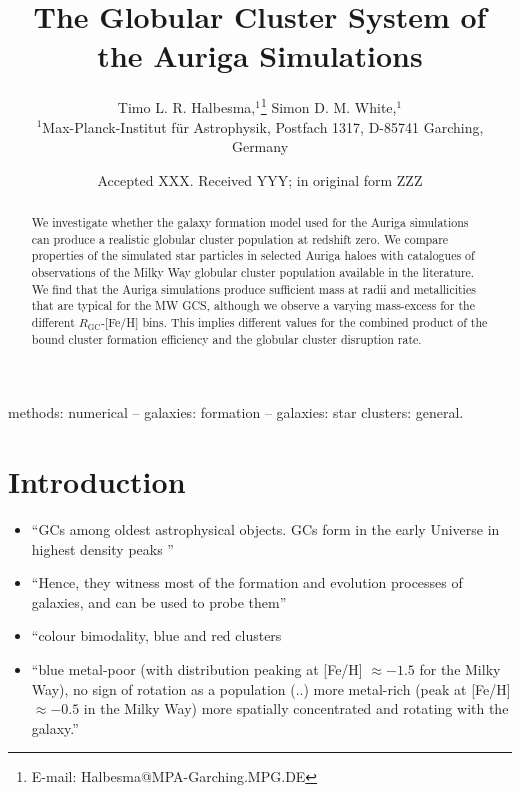 \documentclass[a4paper,fleqn,usenatbib]{mnras}
\title[Auriga GCS]{The Globular Cluster System of the Auriga Simulations}
\author[T. L. R. Halbesma et al.]{
Timo L. R. Halbesma,$^{1}$\thanks{E-mail: Halbesma@MPA-Garching.MPG.DE}
Simon D. M. White,$^{1}$
\\
$^{1}$Max-Planck-Institut f\"ur Astrophysik, Postfach 1317, D-85741 Garching, Germany\\
}
\date{Accepted XXX. Received YYY; in original form ZZZ}
\begin{document}
\label{firstpage}
\pagerange{\pageref{firstpage}--\pageref{lastpage}}
\maketitle

\begin{abstract}
We investigate whether the galaxy formation model used for the Auriga simulations 
can produce a realistic globular cluster population at redshift zero. We compare
properties of the simulated star particles in selected Auriga haloes with
catalogues of observations of the Milky Way globular cluster population available
in the literature. We find that the Auriga simulations produce sufficient mass
at radii and metallicities that are typical for the MW GCS, although we observe
a varying mass-excess for the different $R_{\text{GC}}$-[Fe/H] bins. This implies
different values for the combined product of the bound cluster formation efficiency
and the globular cluster disruption rate.
\end{abstract}

\begin{keywords}
methods: numerical -- galaxies: formation -- galaxies: star clusters: general.
\end{keywords}



\section{Introduction}
\begin{itemize}
    \item ``GCs among oldest astrophysical objects. GCs form in the early Universe in highest density peaks \citep[e.g.][]{2005MNRAS.364..367D, 2009ApJ...706L.192B}''
    \item ``Hence, they witness most of the formation and evolution processes of galaxies, and can be used to probe them'' \citep{2006ARA&A..44..193B}
    \item ``colour bimodality, blue and red clusters \citep[e.g.][]{1985ApJ...293..424Z, 1999AJ....118.1526G, 2001AJ....121.2974L, 2006ApJ...639...95P}
    \item ``blue metal-poor (with distribution peaking at [Fe/H] $\approx -1.5$ for the Milky Way), no sign of rotation as a population (..) more metal-rich (peak at [Fe/H] $\approx -0.5$ in the Milky  Way) more spatially concentrated and rotating with the galaxy.'' \citep{1996AJ....112.1487H}
\end{itemize}
 
\end{document}
